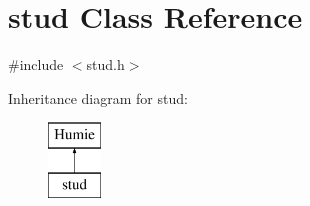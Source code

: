 \hypertarget{structstud}{}\section{stud Class Reference}
\label{structstud}


{\ttfamily \#include $<$stud.\+h$>$}

Inheritance diagram for stud\+:\begin{figure}[H]
\begin{center}
\leavevmode
\includegraphics[height=2.000000cm]{d0/da2/structstud}
\end{center}
\end{figure}
